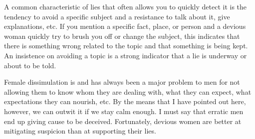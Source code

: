 \par A common characteristic of lies that often allows you to quickly detect it is the tendency to avoid a specific subject and a resistance to talk about it, give explanations, etc. If you mention a specific fact, place, or person and a devious woman quickly try to brush you off or change the subject, this indicates that there is something wrong related to the topic and that something is being kept. An insistence on avoiding a topic is a strong indicator that a lie is underway or about to be told.

\par Female dissimulation is and has always been a major problem to men for not allowing them to know whom they are dealing with, what they can expect, what expectations they can nourish, etc. By the means that I have pointed out here, however, we can outwit it if we stay calm enough. I must say that erratic men end up giving cause to be deceived. Fortunately, devious women are better at mitigating suspicion than at supporting their lies.